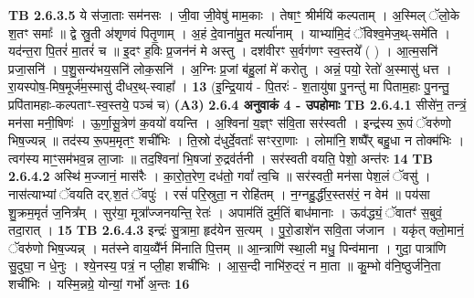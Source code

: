 \documentclass[17pt]{extarticle}
\begin{document}
                  \newline
                                \textbf{ TB 2.6.3.5} \newline
                  ये स॑जा॒ताः सम॑नसः । जी॒वा जी॒वेषु॑ माम॒काः । तेषाꣳ॒॒ श्रीर्मयि॑ कल्पताम् । अ॒स्मिल् ॅलो॒के श॒तꣳ समाः᳚ ॥ द्वे स्रु॒ती अ॑शृणवं पितृ॒णाम् । अ॒हं दे॒वाना॑मु॒त मर्त्या॑नाम् । याभ्या॑मि॒दं ॅविश्व॒मेज॒थ्-समे॑ति । यद॑न्त॒रा पि॒तरं॑ मा॒तरं॑ च ॥ इ॒दꣳ ह॒विः प्र॒जन॑नं मे अस्तु । दश॑वीरꣳ स॒र्वग॑णꣳ स्व॒स्तये᳚ ( ) । आ॒त्म॒सनि॑ प्रजा॒सनि॑ । प॒शु॒सन्य॑भय॒सनि॑ लोक॒सनि॑ । अ॒ग्निः प्र॒जां ब॑हु॒लां मे॑ करोतु । अन्नं॒ पयो॒ रेतो॑ अ॒स्मासु॑ धत्त । रा॒यस्पोष॒-मिष॒मूर्ज॑म॒स्मासु॑ दीधर॒थ्-स्वाहा᳚ । \textbf{ 13} \newline
                  \newline
                                    (इ॒न्द्रि॒याय॑ - पि॒तरः॑ - श॒तायु॑षा पु॒नन्तु॑ मा पिताम॒हाः पु॒नन्तु॒ प्रपि॑तामहाः-कल्पताꣳ-स्व॒स्तये॒ पञ्च॑ च) \textbf{(A3)} \newline \newline
                \textbf{ 2.6.4     अनुवाकं   4 - उपहोमाः} \newline
                                \textbf{ TB 2.6.4.1} \newline
                  सीसे॑न॒ तन्त्रं॒ मन॑सा मनी॒षिणः॑ । ऊ॒र्णा॒सू॒त्रेण॑ क॒वयो॑ वयन्ति । अ॒श्विना॑ य॒ज्ञ्ꣳ स॑वि॒ता सर॑स्वती । इन्द्र॑स्य रू॒पं ॅवरु॑णो भिष॒ज्यन्न् ॥ तद॑स्य रू॒पम॒मृतꣳ॒॒ शची॑भिः । ति॒स्रो द॑धुर्दे॒वताः᳚ सꣳररा॒णाः । लोमा॑नि॒ शष्पै᳚र् बहु॒धा न तोक्म॑भिः । त्वग॑स्य माꣳ॒॒सम॑भव॒न्न ला॒जाः ॥ तद॒श्विना॑ भि॒षजा॑ रु॒द्रव॑र्तनी । सर॑स्वती वयति॒ पेशो॒ अन्त॑रः \textbf{ 14} \newline
                  \newline
                                \textbf{ TB 2.6.4.2} \newline
                  अस्थि॑ म॒ज्जानं॒ मास॑रैः । का॒रो॒त॒रेण॒ दध॑तो॒ गवां᳚ त्व॒चि ॥ सर॑स्वती॒ मन॑सा पेश॒लं ॅवसु॑ । नास॑त्याभ्यां ॅवयति दर्.श॒तं ॅवपुः॑ । रसं॑ परि॒स्रुता॒ न रोहि॑तम् । न॒ग्नहु॒र्द्धीर॒स्तस॑रं॒ न वेम॑ ॥ पय॑सा शु॒क्रम॒मृतं॑ ज॒नित्र᳚म् । सुर॑या॒ मूत्रा᳚ज्जनयन्ति॒ रेतः॑ । अपाम॑तिं दुर्म॒तिं बाध॑मानाः । ऊव॑द्ध्यं॒ ॅवातꣳ॑ स॒बुवं॒ तदा॒रात् । \textbf{ 15} \newline
                  \newline
                                \textbf{ TB 2.6.4.3} \newline
                  इन्द्रः॑ सु॒त्रामा॒ हृद॑येन स॒त्यम् । पु॒रो॒डाशे॑न सवि॒ता ज॑जान । यकृ॑त् क्लो॒मानं॒ ॅवरु॑णो भिष॒ज्यन्न् । मत॑स्ने वाय॒व्यै᳚र्न मि॑नाति पि॒त्तम् ॥ आ॒न्त्राणि॑ स्था॒ली मधु॒ पिन्व॑माना । गुदा॒ पात्रा॑णि सु॒दुघा॒ न धे॒नुः । श्ये॒नस्य॒ पत्रं॒ न प्ली॒हा शची॑भिः । आ॒स॒न्दी नाभि॑रु॒दरं॒ न मा॒ता ॥ कु॒म्भो व॑नि॒ष्ठुर्ज॑नि॒ता शची॑भिः । यस्मि॒न्नग्रे॒ योन्यां॒ गर्भो॑ अ॒न्तः \textbf{ 16} \newline
\end{document}
